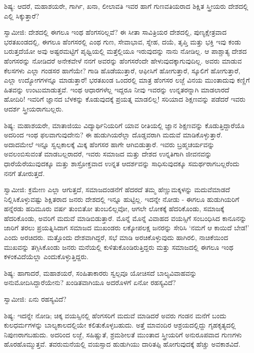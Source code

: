 ಶಿಷ್ಯ: ಆದರೆ, ಮಹಾಶಯರೇ, ಗಾರ್ಗಿ, ಖನಾ, ಲೀಲಾವತಿ ಇವರ ಹಾಗೆ ಗುಣವತಿಯರಾದ ಶಿಕ್ಷಿತ ಸ್ತ್ರೀಯರು ದೇಶದಲ್ಲಿ ಎಲ್ಲಿ ಸಿಕ್ಕುತ್ತಾರೆ?

ಸ್ವಾಮೀಜಿ: ದೇಶದಲ್ಲಿ ಈಗಲೂ ಇಂಥ ಹೆಂಗಸರಿಲ್ಲವೆ? ಈ ಸೀತಾ ಸಾವಿತ್ರಿಯರ ದೇಶದಲ್ಲಿ, ಪುಣ್ಯಕ್ಷೇತ್ರವಾದ ಭರತಖಂಡದಲ್ಲಿ, ಈಗಲೂ ಹೆಂಗಸರಲ್ಲಿ ಎಂಥ ಗುಣ, ಸೇವಾಭಾವ, ಸ್ನೇಹ, ದಯೆ, ತೃಪ್ತಿ ಮತ್ತು ಭಕ್ತಿ ಇವು ಕಂಡು ಬರುತ್ತದೆಯೋ ಅವು ಅಷ್ಟರಮಟ್ಟಿಗೆ ಪೃಥ್ವಿಯಲ್ಲಿ ಮತ್ತೆಲ್ಲಿಯೂ ಇರುವುದನ್ನು ನಾನು ನೋಡಿಲ್ಲ. ಆ ಪಾಶ್ಚಾತ್ಯ ದೇಶದ ಹೆಂಗಸರನ್ನು ನೋಡಿದರೆ ಅನೇಕವೇಳೆ ನನಗೆ ಅವರನ್ನು ಹೆಂಗಸರೆಂದೇ ಹೇಳುವುದಕ್ಕಾಗುವುದಿಲ್ಲ. ಅವರು ಮಾಡುವ ಕೆಲಸಗಳು ಎಲ್ಲಾ ಗಂಡಸರ ಹಾಗೆಯೇ? ಗಾಡಿ ಹೊಡೆಯುತ್ತಾರೆ, ಆಫೀಸಿಗೆ ಹೋಗುತ್ತಾರೆ, ಸ್ಕೂಲಿಗೆ ಹೋಗುತ್ತಾರೆ, ಎಲ್ಲಾ ಉದ್ಯೋಗಗಳನ್ನೂ ಮಾಡುತ್ತಾರೆ! ಭರತಖಂಡ ಒಂದರಲ್ಲಿ ಮಾತ್ರ ಹೆಂಗಸರ ಲಜ್ಜೆ ವಿನಯ ಮುಂತಾದುವು ಕಣ್ಣಿಗೆ ಹಿತವನ್ನು ಉಂಟುಮಾಡುತ್ತವೆ. ಇಂಥ ಆಧಾರಗಳೆಲ್ಲ ಇದ್ದರೂ ನೀವು ಇವರನ್ನು ಉನ್ನತರನ್ನಾಗಿ ಮಾಡಲಾರದೆ ಹೋದಿರಿ! ಇವರಿಗೆ ಜ್ಞಾನದ ಬೆಳಕನ್ನು ಕೊಡುವುದಕ್ಕೆ ಪ್ರಯತ್ನ ಮಾಡಲಿಲ್ಲ! ಸರಿಯಾದ ಶಿಕ್ಷಣವನ್ನು ಪಡೆದರೆ ಇವರು ಆದರ್ಶ ಸ್ತ್ರೀಯರಾಗಬಲ್ಲರು.

ಶಿಷ್ಯ: ಮಹಾಶಯರೇ, ಮಾತಾಜಿಯು ವಿದ್ಯಾರ್ಥಿನಿಯರಿಗೆ ಯಾವ ರೀತಿಯಲ್ಲಿ ಜ್ಞಾನ ಶಿಕ್ಷಣವನ್ನು ಕೊಡುತ್ತಿದ್ದಾರೆಯೊ ಅದರಿಂದ ಇಂಥ ಫಲವಾಗುವುದೇನು? ಈ ಹುಡುಗಿಯರೆಲ್ಲಾ ದೊಡ್ಡವರಾಗಿ ಮದುವೆ ಮಾಡಿಕೊಳ್ಳುತ್ತಾರೆ. ಅದಾದಮೇಲೆ ಇನ್ನೂ ಸ್ವಲ್ಪಕಾಲಕ್ಕೆ ಮಿಕ್ಕ ಹೆಂಗಸರ ಹಾಗೇ ಆಗಿಬಿಡುತ್ತಾರೆ. ಇವರು ಬ್ರಹ್ಮಚರ್ಯವನ್ನು ಅವಲಂಬಿಸುವಂತೆ ಮಾಡಬಲ್ಲರಾದರೆ, ಇವರು ಸಮಾಜದ ಮತ್ತು ದೇಶದ ಉನ್ನತಿಗಾಗಿ ಜೀವನವನ್ನು ಧಾರೆಯೆರೆಯುವುದಕ್ಕೂ ಮತ್ತು ಶಾಸ್ರೋಕ್ತವಾದ ಉನ್ನತ ಆದರ್ಶವನ್ನು ಸಾಧಿಸುವುದಕ್ಕೂ ಸಮರ್ಥರಾಗಬಲ್ಲರೆಂದು ನನಗೆ ತೋರುತ್ತದೆ.

ಸ್ವಾಮೀಜಿ: ಕ್ರಮೇಣ ಎಲ್ಲಾ ಆಗುತ್ತದೆ, ಸಮಾಜದಂಡನೆಗೆ ಹೆದರದೆ ತಮ್ಮ ಹೆಣ್ಣುಮಕ್ಕಳನ್ನು ಮದುವೆಮಾಡದೆ ನಿಲ್ಲಿಸಿಕೊಳ್ಳುವಷ್ಟು ಶಿಕ್ಷಿತರಾದ ಜನರು ದೇಶದಲ್ಲಿ ಇನ್ನೂ ಹುಟ್ಟಿಲ್ಲ. ಇದನ್ನೇ ನೋಡು - ಈಗಲೂ ಹುಡುಗಿಯರಿಗೆ ಹನ್ನೆರಡು ಹದಿಮೂರು ವರ್ಷ ತುಂಬಿತೋ ತುಂಬಲಿಲ್ಲವೋ, ಆಗಲೇ ಲೋಕಕ್ಕೆ ಹೆದರಿಕೊಂಡು, ಸಮಾಜಕ್ಕೆ ಹೆದರಿಕೊಂಡು, ಅವರಿಗೆ ಮದುವೆ ಮಾಡಿಬಿಡುತ್ತಾರೆ. ಮೊನ್ನೆ ಮೊನ್ನೆ ವಿವಾಹದ ವಯಸ್ಸಿಗೆ ಸಂಬಂಧಿಸಿದ ಕಾನೂನನ್ನು ಜಾರಿಗೆ ತರಲು ಪ್ರಯತ್ನಿಸಿದಾಗ ಸಮಾಜದ ಮುಖಂಡರು ಲಕ್ಕೋಪಲಕ್ಷ ಜನರನ್ನು ಸೇರಿಸಿ ‘ನಮಗೆ ಆ ಕಾಯಿದೆ ಬೇಡ!’ ಎಂದು ಅರಚಿದರು. ಮತ್ತೊಂದು ದೇಶವಾಗಿದ್ದರೆ, ಸಭೆ ಮಾಡಿ ಅರಚಿಕೊಳ್ಳುವುದು ಹಾಗಿರಲಿ, ನಾಚಿಕೆಯಿಂದ ಮುಖವನ್ನು ತಗ್ಗಿಸಿಕೊಂಡು ಜನರು ಮನೆಯಲ್ಲಿ ಕುಳಿತುಕೊಂಡಿರುತ್ತಿದ್ದರು ಮತ್ತು ಸಮಾಜದಲ್ಲಿ ಈಗಲೂ ಇಂಥ ಕಳಂಕವಿದೆಯೆಲ್ಲಾ ಎಂದುಕೊಳ್ಳುತ್ತಿದ್ದರು.

ಶಿಷ್ಯ: ಹಾಗಾದರೆ, ಮಹಾಶಯರೆ, ಸಂಹಿತಾಕಾರರು ಸ್ವಲ್ಪವೂ ಯೋಚಿಸದೆ ಬಾಲ್ಯವಿವಾಹವನ್ನು ಅನುಮೋದಿಸಿದ್ದಾರೆಯೇನು? ಖಂಡಿತವಾಗಿಯೂ ಅದರೊಳಗೆ ಏನೋ ರಹಸ್ಯವಿದೆ?

ಸ್ವಾಮೀಜಿ: ಏನು ರಹಸ್ಯವಿದೆ?

ಶಿಷ್ಯ: ಇದನ್ನೇ ನೋಡಿ; ಚಿಕ್ಕ ವಯಸ್ಸಿನಲ್ಲಿ ಹೆಂಗಸರಿಗೆ ಮದುವೆ ಮಾಡಿದರೆ ಅವರು ಗಂಡನ ಮನೆಗೆ ಬಂದು ಕುಲಧರ್ಮಗಳನ್ನು ಬಾಲ್ಯಕಾಲದಲ್ಲಿಯೇ ಕಲಿತುಕೊಳ್ಳಬಹುದು. ಅತ್ತೆ ಮಾವಂದಿರ ಆಶ್ರಯದಲ್ಲಿದ್ದು ಗೃಹಕೃತ್ಯದಲ್ಲಿ ನಿಪುಣರಾಗಬಹುದು. ಅದರಿಂದ ಲಜ್ಜೆ, ಸಹಿಷ್ಣುತೆ, ಶ್ರಮಶೀಲತೆ ಮುಂತಾದ ಸ್ತ್ರೀಯರಿಗೆ ಅನುರೂಪವಾದ ಗುಣಗಳು ಹೊರಹೊಮ್ಮುತ್ತವೆ. ತವರುಮನೆಯಲ್ಲಿ ವಯಸ್ಸಾದ ಹುಡುಗಿಯು ದಾರಿತಪ್ಪಿ ಹೋಗುವುದಕ್ಕೆ ಹೆಚ್ಚು ಅವಕಾಶವಿದೆ.

